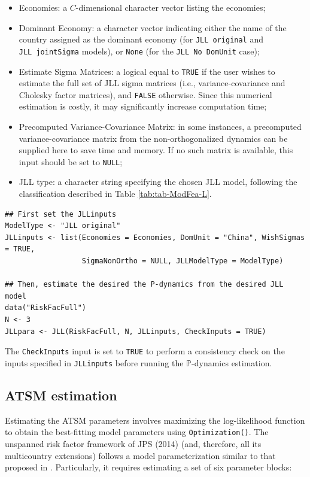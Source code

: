 \begin{itemize}
\item
  Economies: a \(C\)-dimensional character vector listing the economies;
\item
  Dominant Economy: a character vector indicating either the name of the country assigned as the dominant economy (for \texttt{JLL\ original} and \texttt{JLL\ jointSigma} models), or \texttt{None} (for the \texttt{JLL\ No\ DomUnit} case);
\item
  Estimate Sigma Matrices: a logical equal to \texttt{TRUE} if the user wishes to estimate the full set of JLL sigma matrices (i.e., variance-covariance and Cholesky factor matrices), and \texttt{FALSE} otherwise. Since this numerical estimation is costly, it may significantly increase computation time;
\item
  Precomputed Variance-Covariance Matrix: in some instances, a precomputed variance-covariance matrix from the non-orthogonalized dynamics can be supplied here to save time and memory. If no such matrix is available, this input should be set to \texttt{NULL};
\item
  JLL type: a character string specifying the chosen JLL model, following the classification described in Table \ref{tab:tab-ModFea-L}.
\end{itemize}

\begin{verbatim}
## First set the JLLinputs
ModelType <- "JLL original"
JLLinputs <- list(Economies = Economies, DomUnit = "China", WishSigmas = TRUE,
                  SigmaNonOrtho = NULL, JLLModelType = ModelType)

## Then, estimate the desired the P-dynamics from the desired JLL model
data("RiskFacFull")
N <- 3
JLLpara <- JLL(RiskFacFull, N, JLLinputs, CheckInputs = TRUE)
\end{verbatim}

The \texttt{CheckInputs} input is set to \texttt{TRUE} to perform a consistency check on the inputs specified in \texttt{JLLinputs} before running the \(\mathbb{P}\)-dynamics estimation.

\subsection{ATSM estimation}\label{atsm-estimation}

Estimating the ATSM parameters involves maximizing the log-likelihood function to obtain the best-fitting model parameters using \texttt{Optimization()}. The unspanned risk factor framework of JPS (2014) (and, therefore, all its multicountry extensions) follows a model parameterization similar to that proposed in \citet{JoslinSingletonZhu2011}. Particularly, it requires estimating a set of six parameter blocks:

